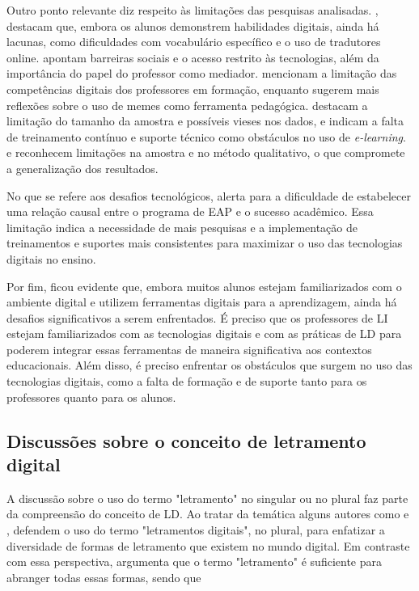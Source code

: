 Outro ponto relevante diz respeito às limitações das pesquisas
analisadas. \textcite{oliveira2018multiletramentos}, destacam que, embora os
alunos demonstrem habilidades digitais, ainda há lacunas, como
dificuldades com vocabulário específico e o uso de tradutores online.
\textcite{valadares2021videogames} apontam barreiras sociais e o acesso restrito
às tecnologias, além da importância do papel do professor como mediador.
\textcite{campbell2020developing} mencionam a limitação das competências digitais
dos professores em formação, enquanto \textcite{xavier2019construcao}
sugerem mais reflexões sobre o uso de memes como ferramenta pedagógica.
\textcite{almusharraf2020postsecondary} destacam a limitação do tamanho da amostra
e possíveis vieses nos dados, e \textcite{dhillon2021investigation} indicam a falta
de treinamento contínuo e suporte técnico como obstáculos no uso de
\emph{e-learning}. \textcite{krajka2021} e \textcite{bozavli2021foreign} reconhecem limitações
na amostra e no método qualitativo, o que compromete a generalização dos
resultados.

No que se refere aos desafios tecnológicos, \textcite{roche2017assessing} alerta para a
dificuldade de estabelecer uma relação causal entre o programa de EAP e
o sucesso acadêmico. Essa limitação indica a necessidade de mais
pesquisas e a implementação de treinamentos e suportes mais consistentes
para maximizar o uso das tecnologias digitais no ensino.

Por fim, ficou evidente que, embora muitos alunos estejam familiarizados
com o ambiente digital e utilizem ferramentas digitais para a
aprendizagem, ainda há desafios significativos a serem enfrentados. É
preciso que os professores de LI estejam familiarizados com as
tecnologias digitais e com as práticas de LD para poderem integrar essas
ferramentas de maneira significativa aos contextos educacionais. Além
disso, é preciso enfrentar os obstáculos que surgem no uso das
tecnologias digitais, como a falta de formação e de suporte tanto para
os professores quanto para os alunos.

\subsection{Discussões sobre o conceito de letramento digital}\label{sub-sec-discussõesconceitoletramentodigital}

A discussão sobre o uso do termo "letramento" no singular ou no plural
faz parte da compreensão do conceito de LD. Ao tratar da temática alguns
autores como \textcite{dudeney2016letramentos} e \textcite{rojo2019letramentos},
defendem o uso do termo "letramentos digitais", no plural, para
enfatizar a diversidade de formas de letramento que existem no mundo
digital. Em contraste com essa perspectiva, \textcite{paiva2021letramento} argumenta que o
termo "letramento" é suficiente para abranger todas essas formas, sendo
que

